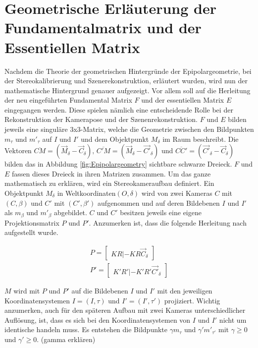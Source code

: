 \section{Geometrische Erläuterung der Fundamentalmatrix und der Essentiellen Matrix }

Nachdem die Theorie der geometrischen Hintergründe der Epipolargeometrie, bei der Stereokalibrierung und Szenerekonstruktion, erläutert wurden, wird nun der mathematische Hintergrund genauer aufgezeigt. Vor allem soll auf die Herleitung der neu eingeführten Fundamental Matrix $F$ und der essentiellen Matrix $E$ eingegangen werden. Diese spielen nämlich eine entscheidende Rolle bei der Rekonstruktion der Kamerapose und der Szenenrekonstruktion\cite{Elements, HZ}. $F$ und $E$ bilden jeweils eine singuläre 3x3-Matrix, welche die Geometrie zwischen den Bildpunkten $m_\tau$ und $m'_\tau$ auf $I$ und $I'$ und dem Objektpunkt $M_\delta$ im Raum beschreibt. Die Vektoren $\overline{CM} = (\vec{M}_\delta - \vec{C}_\delta),\, \overline{C'M} = (\vec{M}_\delta - \vec{C'}_\delta)$ und $\overline{CC'} = (\vec{C'}_\delta - \vec{C}_\delta)$ bilden das in Abbildung \ref{fig:Epipolargeometry} sichtbare schwarze Dreieck. $F$ und $E$ fassen dieses Dreieck in ihren Matrizen zusammen. Um das ganze mathematisch zu erklären, wird ein Stereokameraufbau definiert. Ein Objektpunkt $M_\delta$ in Weltkoordinaten$(O,\delta)$ wird von zwei Kameras $C$ mit $(C,\beta)$ und $C'$ mit $(C',\beta')$ aufgenommen und auf deren Bildebenen $I$ und $I'$ als $m_\beta$ und $m'_\beta$ abgebildet. $C$ und $C'$ besitzen jeweils eine eigene Projektionsmatrix $P$ und $P'$. Anzumerken ist, dass die folgende Herleitung nach \cite{Elements} aufgestellt wurde.

\begin{gather}
P = \begin{bmatrix}
KR|-KR\vec{C}_\delta
\end{bmatrix}\\
P' = \begin{bmatrix}
K'R'|-K'R'\vec{C'}_\delta
\end{bmatrix}
\end{gather}

$M$ wird mit $P$ und $P'$ auf die Bildebenen $I$ und $I'$ mit den jeweiligen Koordinatensystemen $I = (I,\tau)$ und $I'= (I',\tau')$ projiziert. Wichtig anzumerken, auch für den späteren Aufbau mit zwei Kameras unterschiedlicher Auflösung, ist, dass es sich bei den Koordinatensystemen von $I$ und $I'$ nicht um identische handeln muss.\cite{Elements} Es entstehen die Bildpunkte $\gamma m_\tau$ und $\gamma' m'_{\tau'}$ mit $\gamma \geq 0$ und $\gamma' \geq 0$. (gamma erklären)


